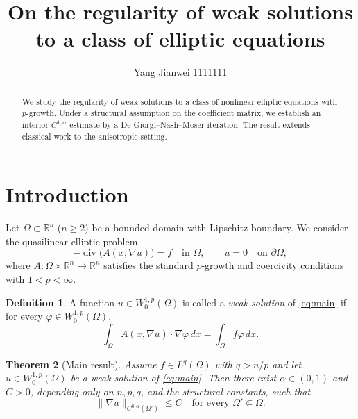 \documentclass[11pt,reqno]{amsart}
\title[Short title]{On the regularity of weak solutions to a class of elliptic equations}
\author{Yang Jianwei       1111111}
\newtheorem{theorem}{Theorem}[section]
\theoremstyle{definition}
\newtheorem{definition}[theorem]{Definition}
\newcommand{\R}{\mathbb{R}}
\newcommand{\Om}{\Omega}
\begin{document}
\begin{abstract}
We study the regularity of weak solutions to a class of nonlinear elliptic
equations with $p$-growth. Under a structural assumption on the coefficient
matrix, we establish an interior $C^{1,\alpha}$ estimate by a De Giorgi--Nash--Moser
iteration. The result extends classical work to the anisotropic setting.
\end{abstract}

\maketitle

\section{Introduction}\label{sec:intro}

Let $\Om\subset\R^n$ ($n\ge 2$) be a bounded domain with Lipschitz boundary.
We consider the quasilinear elliptic problem
\begin{equation}\label{eq:main}
  -\operatorname{div}\bigl(A(x,\nabla u)\bigr)=f \quad \text{in } \Om,
  \qquad u=0 \quad \text{on } \partial\Om ,
\end{equation}
where $A:\Om\times\R^n\to\R^n$ satisfies the standard $p$-growth and
coercivity conditions with $1<p<\infty$.

\begin{definition}\label{def:weak}
A function $u\in W^{1,p}_0(\Om)$ is called a \emph{weak solution} of
\eqref{eq:main} if for every $\varphi\in W^{1,p}_0(\Om)$,
\begin{equation}\label{eq:weak}
  \int_{\Om} A(x,\nabla u)\cdot\nabla\varphi\,dx
  = \int_{\Om} f\varphi\,dx .
\end{equation}
\end{definition}

\begin{theorem}[Main result]\label{thm:main}
Assume $f\in L^q(\Om)$ with $q>n/p$ and let $u\in W^{1,p}_0(\Om)$ be a weak
solution of \eqref{eq:main}. Then there exist $\alpha\in(0,1)$ and $C>0$,
depending only on $n,p,q$, and the structural constants, such that
\begin{equation}\label{eq:holder}
  \|\nabla u\|_{C^{0,\alpha}(\Om')} \le C
  \quad\text{for every } \Om'\Subset\Om .
\end{equation}
\end{theorem}
\end{document}

